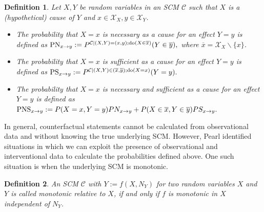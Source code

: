\documentclass[letterpaper]{article}
\newcommand{\kC}{\mathcal{C}}   %
\newcommand{\kX}{\mathcal{X}}   %
\newtheorem{Def}{Definition}
\newcommand{\DO}{{\rm do}}
\newcommand{\PN}{{\rm PN}}
\newcommand{\PS}{{\rm PS}}
\newcommand{\PNS}{{\rm PNS}}
\begin{document}
\begin{Def}
Let $X, Y$ be random variables in an SCM $\kC$ such that $X$ is a (hypothetical) cause of $Y$ and $x \in \kX_X, y \in \kX_Y$.
\begin{itemize}
	\item The probability that $X=x$ is necessary as a cause for an effect $Y=y$ is defined as
	$\PN_{x\rightarrow y} := P^{\kC|(X,Y)=(x,y);\DO(X\in \overline{x})}(Y\in \overline{y}),$
	where $\overline{x} = \kX_X \backslash \{x\}$.
	\item The probability that $X=x$ is sufficient as a cause for an effect $Y=y$ is defined as
	$\PS_{x\rightarrow y} := P^{\kC|(X,Y)\in(\overline{x},\overline{y});\DO(X=x)}(Y=y).$
	\item The probability that $X=x$ is necessary and sufficient as a cause for an effect $Y=y$ is defined as $\PNS_{x\rightarrow y} := P(X=x,Y=y) PN_{x\rightarrow y} + P(X\in \overline{x},Y\in \overline{y})PS_{x\rightarrow y}.$
\end{itemize}
\end{Def}

In general, counterfactual statements cannot be calculated from observational data and without knowing the true underlying SCM. However, Pearl identified situations in which we can exploit the presence of observational and interventional data to calculate the probabilities defined above. One such situation is when the underlying SCM is monotonic.

\begin{Def}
An SCM $\kC$ with $Y:= f(X, N_Y)$ for two random variables $X$ and $Y$ is called {\em monotonic} relative to $X$, if and only if $f$ is monotonic in $X$ independent of $N_Y$.
\end{Def}
\end{document}
